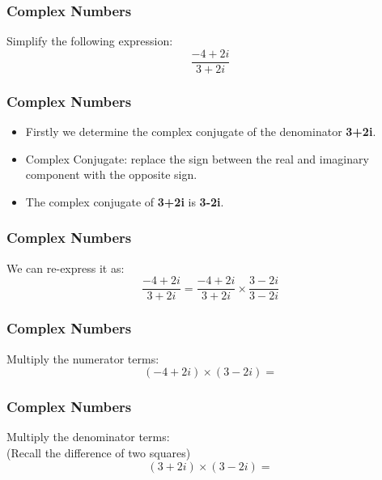 \documentclass{beamer}
\begin{document}
\begin{frame}
\frametitle{Complex Numbers}
{
\LARGE
Simplify the following expression:
\[ \frac{-4+2i}{3+2i}
\]
}
\end{frame}


\begin{frame}
\frametitle{Complex Numbers}
{
\LARGE
\begin{itemize}
\item Firstly we determine the complex conjugate of the denominator \textbf{3+2i}.
\item Complex Conjugate: replace the sign between the real and imaginary component with the opposite sign.
\item The complex conjugate of \textbf{3\alert{+}2i} is \textbf{3\alert{-}2i}.
\end{itemize}
}
\end{frame}

\begin{frame}
\frametitle{Complex Numbers}
{
\LARGE
We can re-express it as:\\
\[ \frac{-4+2i}{3+2i} = \frac{-4+2i}{3+2i} \times \frac{3-2i}{3-2i}
\]
}
\end{frame}
\begin{frame}
\frametitle{Complex Numbers}
{
\LARGE
\vspace{-2.5cm}
Multiply the numerator terms:\\

\[(-4+2i) \times (3-2i) =  
\]
}
\end{frame}
\begin{frame}
\frametitle{Complex Numbers}
{
\LARGE
\vspace{-2.5cm}
Multiply the denominator terms:\\
(Recall the difference of two squares)
\[(3+2i) \times (3-2i) =  
\]


}
\end{frame}
\end{document}
